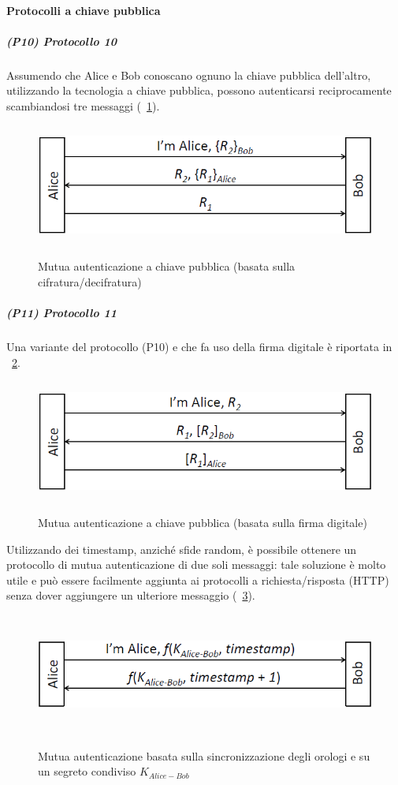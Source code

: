 \paragraph{Protocolli a chiave pubblica}
\subparagraph{(P10) Protocollo 10}
Assumendo che Alice e Bob conoscano ognuno la chiave pubblica dell'altro, utilizzando la tecnologia a chiave pubblica, possono autenticarsi reciprocamente scambiandosi tre messaggi (\figurename~\ref{fig:ImgS47bis}).
\begin{figure}[htbp]
	\centering%
	\subfigure%
	{\includegraphics[height=4cm, width=12cm, keepaspectratio]{Immagini/autenticazione/ImgS47bis.png}}
	\caption{Mutua autenticazione a chiave pubblica (basata sulla cifratura/decifratura)}\label{fig:ImgS47bis} 	
\end{figure}
\subparagraph{(P11) Protocollo 11}
Una variante del protocollo (P10) e che fa uso della firma digitale è riportata in \figurename~\ref{fig:ImgS48bis}.
\begin{figure}[htbp]
	\centering%
	\subfigure%
	{\includegraphics[height=4cm, width=12cm, keepaspectratio]{Immagini/autenticazione/ImgS48bis.png}}
	\caption{Mutua autenticazione a chiave pubblica (basata sulla firma digitale)}\label{fig:ImgS48bis} 	
\end{figure}
Utilizzando dei timestamp, anziché sfide random, è possibile ottenere un protocollo di mutua autenticazione di due soli messaggi: tale soluzione è molto utile e può essere facilmente aggiunta ai protocolli a richiesta/risposta (HTTP) senza dover aggiungere un ulteriore messaggio (\figurename~\ref{fig:ImgS53bis}).
\begin{figure}[htbp]
	\centering%
	\subfigure%
	{\includegraphics[height=4cm, width=12cm, keepaspectratio]{Immagini/autenticazione/ImgS53bis.png}}
	\caption{Mutua autenticazione basata sulla sincronizzazione degli orologi e su un segreto condiviso $K_{Alice-Bob}$}\label{fig:ImgS53bis} 	
\end{figure}
